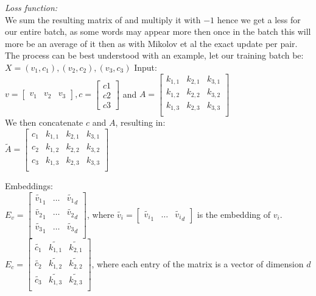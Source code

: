 \textit{Loss function:}\\
We sum the resulting matrix of and multiply it with $-1$  hence we get a less for our entire batch, as some words may appear more then once in the batch this will more be an average of it then as with Mikolov et al the exact update per pair. \\
The process can be best understood with an example, let our training batch be:\\ $X = {(v_1,c_1),(v_2,c_2),(v_3,c_3)}$
Input:\\
 $v = \begin{bmatrix}
v_1 & v_2 & v_3
\end{bmatrix}, c = \begin{bmatrix}
c1\\
c2\\
c3\end{bmatrix}$ and $A = 
\begin{bmatrix}
k_{1,1} & k_{2,1} & k_{3,1}\\
k_{1,2} & k_{2,2} & k_{3,2}\\
k_{1,3} & k_{2,3} & k_{3,3}\\
\end{bmatrix}$\\

 We then concatenate $c$ and $A$, 
resulting in: \\
$\tilde{A} = \begin{bmatrix}
c_1 & k_{1,1} & k_{2,1} & k_{3,1}\\
c_2 & k_{1,2} & k_{2,2} & k_{3,2}\\
c_3 & k_{1,3} & k_{2,3}& k_{3,3}\\
\end{bmatrix}$

Embeddings:\\
$E_v = \begin{bmatrix}
\tilde{v_1}_1 & \ldots & \tilde{v_1}_d\\
\tilde{v_2}_1 & \ldots & \tilde{v_2}_d\\
\tilde{v_3}_1 & \ldots & \tilde{v_3}_d\\
\end{bmatrix}
$, where $\tilde{v_i} = \begin{bmatrix}
\tilde{v_i}_1 & \ldots & \tilde{v_i}_d \end{bmatrix}$ is the embedding of $v_i$.  \\$E_c = \begin{bmatrix}
\tilde{c_1 }& \tilde{k_{1,1}} & \tilde{k_{2,1}} \\
\tilde{c_2 }& \tilde{k_{1,2}}& \tilde{k_{2,2}} \\
\tilde{c_3 }&\tilde{ k_{1,3} }& \tilde{k_{2,3}}\\
\end{bmatrix}$,
where each entry of the matrix is a vector of dimension $d$\\

